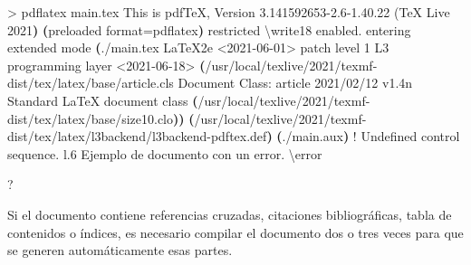 \documentclass[
  a4paper,
]{scrreport}
\newenvironment{Shaded}{\begin{snugshade}}{\end{snugshade}}
\newcommand{\DataTypeTok}[1]{\textcolor[rgb]{0.68,0.00,0.00}{#1}}
\newcommand{\ErrorTok}[1]{\textcolor[rgb]{0.68,0.00,0.00}{#1}}
\newcommand{\ExtensionTok}[1]{\textcolor[rgb]{0.00,0.23,0.31}{#1}}
\newcommand{\KeywordTok}[1]{\textcolor[rgb]{0.00,0.23,0.31}{\textbf{#1}}}
\newcommand{\NormalTok}[1]{\textcolor[rgb]{0.00,0.23,0.31}{#1}}
\newcommand{\OperatorTok}[1]{\textcolor[rgb]{0.37,0.37,0.37}{#1}}
\newcommand{\OtherTok}[1]{\textcolor[rgb]{0.00,0.23,0.31}{#1}}
\newcommand{\VariableTok}[1]{\textcolor[rgb]{0.07,0.07,0.07}{#1}}
\theoremstyle{definition}
\theoremstyle{remark}
\begin{document}
\begin{Shaded}
\begin{Highlighting}[]
\OperatorTok{\textgreater{}}\NormalTok{ pdflatex }\ExtensionTok{main.tex}
\ExtensionTok{This}\NormalTok{ is pdfTeX, Version 3.141592653{-}2.6{-}1.40.22 }\ErrorTok{(}\ExtensionTok{TeX}\NormalTok{ Live 2021}\KeywordTok{)} \KeywordTok{(}\ExtensionTok{preloaded} 
\VariableTok{format}\OperatorTok{=}\NormalTok{pdflatex}\KeywordTok{)} \ExtensionTok{restricted} \DataTypeTok{\textbackslash{}w}\NormalTok{rite18 enabled.}
\ExtensionTok{entering}\NormalTok{ extended mode}
\KeywordTok{(}\ExtensionTok{./main.tex}
\ExtensionTok{LaTeX2e} \OperatorTok{\textless{}}\NormalTok{2021{-}06{-}01}\OperatorTok{\textgreater{}}\NormalTok{ patch level 1}
\ExtensionTok{L3}\NormalTok{ programming layer }\OperatorTok{\textless{}}\NormalTok{2021{-}06{-}18}\OperatorTok{\textgreater{}}
\KeywordTok{(}\ExtensionTok{/usr/local/texlive/2021/texmf{-}dist/tex/latex/base/article.cls}
\ExtensionTok{Document}\NormalTok{ Class: article 2021/02/12 v1.4n Standard LaTeX document class}
\KeywordTok{(}\ExtensionTok{/usr/local/texlive/2021/texmf{-}dist/tex/latex/base/size10.clo}\KeywordTok{))}
\KeywordTok{(}\ExtensionTok{/usr/local/texlive/2021/texmf{-}dist/tex/latex/l3backend/l3backend{-}pdftex.def}\KeywordTok{)}
\KeywordTok{(}\ExtensionTok{./main.aux}\KeywordTok{)}
\OtherTok{! }\ExtensionTok{Undefined}\NormalTok{ control sequence.}
\ExtensionTok{l.6}\NormalTok{ Ejemplo de documento con un error. }\DataTypeTok{\textbackslash{}e}\NormalTok{rror}
                                             
\ExtensionTok{?} 
\end{Highlighting}
\end{Shaded}

\begin{tcolorbox}[enhanced jigsaw, colframe=quarto-callout-warning-color-frame, opacityback=0, title=\textcolor{quarto-callout-warning-color}{\faExclamationTriangle}\hspace{0.5em}{Advertencia}, bottomrule=.15mm, left=2mm, coltitle=black, arc=.35mm, leftrule=.75mm, colback=white, rightrule=.15mm, colbacktitle=quarto-callout-warning-color!10!white, toprule=.15mm, breakable, opacitybacktitle=0.6, bottomtitle=1mm, toptitle=1mm, titlerule=0mm]

Si el documento contiene referencias cruzadas, citaciones
bibliográficas, tabla de contenidos o índices, es necesario compilar el
documento dos o tres veces para que se generen automáticamente esas
partes.

\end{tcolorbox}
\end{document}

